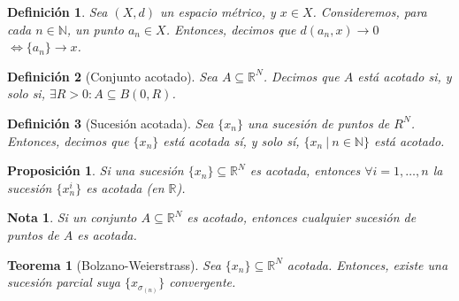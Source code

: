 \documentclass[11pt, a4paper, titlepage]{article}
\makeatletter
\renewenvironment{proof}[1][\proofname] {\vspace{-15pt}\par\pushQED{\qed}\normalfont\topsep6\p@\@plus6\p@\relax\trivlist\item[\hskip\labelsep\it#1\@addpunct{.}]\ignorespaces}{\popQED\endtrivlist\@endpefalse}
\theoremstyle{theorem-style}
\newtheorem*{nth}{Teorema}
\newtheorem*{nprop}{Proposición}
\theoremstyle{definition-style}
\newtheorem*{ndef}{Definición}
\theoremstyle{remark-style}
\newtheorem*{nota}{Nota}
\theoremstyle{example-style}
\makeatother
\begin{document}





\begin{ndef}
Sea $(X,d)$ un espacio métrico, y $x\in X$. Consideremos, para cada $n\in \mathbb{N}$, un punto $a_n \in X$. Entonces, decimos que $d(a_n,x) \rightarrow 0$ $\iff \{a_n\} \rightarrow x$.
\end{ndef}



\begin{ndef}[Conjunto acotado]
Sea $A \subseteq \mathbb{R}^N$. Decimos que $A$ \textit{está acotado} si, y solo si, $\exists R>0: A\subseteq B(0,R)$.
\end{ndef}



\begin{ndef}[Sucesión acotada]
Sea $\{x_n\}$ una sucesión de puntos de $R^N$. Entonces, decimos que $\{x_n\}$ \textit{está acotada} sí, y solo sí, $\{x_n\ | \ n\in \mathbb{N}\}$ está acotado.
\end{ndef}



\begin{nprop}
Si una sucesión $\{x_n\} \subseteq \mathbb{R}^N$ es acotada, entonces $\forall i=1,\dots,n$ la sucesión $\{x_n^i\}$ es acotada (en $\mathbb{R}$).
\end{nprop}



\begin{nota}
Si un conjunto $A\subseteq \mathbb{R}^N$ es acotado, entonces cualquier sucesión de puntos de $A$ es acotada.
\end{nota}



\begin{nth}[Bolzano-Weierstrass]
Sea $\{x_n\}\subseteq \mathbb{R}^N$ acotada. Entonces, existe una sucesión parcial suya $\{x_{\sigma_{(n)}}\}$ convergente.
\end{nth}
\end{document}
